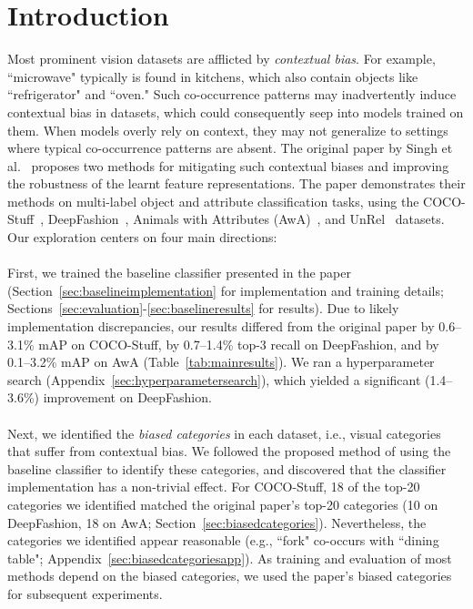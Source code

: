 \section{Introduction}

Most prominent vision datasets are afflicted by \emph{contextual bias}. For example, ``microwave" typically is found in kitchens, which also contain objects like ``refrigerator" and ``oven."  Such co-occurrence patterns may inadvertently induce contextual bias in datasets, which could consequently seep into models trained on them. When models overly rely on context, they may not generalize to settings where typical co-occurrence patterns are absent. The original paper by Singh et al.~\cite{Singh_2020_CVPR} proposes two methods for mitigating such contextual biases and improving the robustness of the learnt feature representations. The paper demonstrates their methods on multi-label object and attribute classification tasks, using the COCO-Stuff~\cite{caesar2018cvpr}, DeepFashion~\cite{liuLQWTcvpr16DeepFashion}, Animals with Attributes (AwA)~\cite{AwA}, and UnRel~\cite{Peyre17} datasets. Our exploration centers on four main directions:\\
\\
First, we trained the baseline classifier presented in the paper (Section~\ref{sec:baselineimplementation} for implementation and training details; Sections~\ref{sec:evaluation}-\ref{sec:baselineresults} for results). Due to likely implementation discrepancies, our results differed from the original paper by 0.6--3.1\% mAP on COCO-Stuff, by 0.7--1.4\% top-3 recall on DeepFashion, and by 0.1--3.2\% mAP on AwA (Table~\ref{tab:mainresults}). We ran a hyperparameter search (Appendix~\ref{sec:hyperparametersearch}), which yielded a significant (1.4--3.6\%) improvement on DeepFashion.\\
\\
Next, we identified the \emph{biased categories} in each dataset, i.e., visual categories that suffer from contextual bias. We followed the proposed method of using the baseline classifier to identify these categories, and discovered that the classifier implementation has a non-trivial effect. For COCO-Stuff, 18 of the top-20 categories we identified matched the original paper's top-20 categories (10 on DeepFashion, 18 on AwA; Section~\ref{sec:biasedcategories}). Nevertheless, the categories we identified appear reasonable  (e.g., ``fork" co-occurs with ``dining table"; Appendix~\ref{sec:biasedcategoriesapp}). As training and evaluation of most methods depend on the biased categories, we used the paper's biased categories for subsequent experiments.\\
